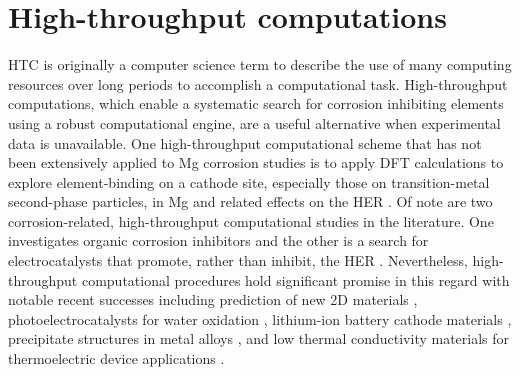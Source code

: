 \section{High-throughput computations}
\ac{HTC} is originally a computer science term to describe the use of many computing resources over long periods to accomplish a computational task.
High-throughput computations, which enable a systematic search for corrosion inhibiting elements using a robust computational engine, are a useful alternative when experimental data is unavailable. One high-throughput computational scheme that has not been extensively applied to Mg corrosion studies is to apply \ac{DFT} calculations to explore element-binding on a cathode site, especially those on transition-metal second-phase particles, in Mg and related effects on the \ac{HER} \cite{zhang2019first}. Of note are two corrosion-related, high-throughput computational studies in the literature. One investigates organic corrosion inhibitors \cite{winkler2017predicting} and the other is a search for electrocatalysts that promote, rather than inhibit, the \ac{HER} \cite{greeley2006computational}. Nevertheless, high-throughput computational procedures hold significant promise in this regard with notable recent successes including prediction of new 2D materials \cite{choudhary2017high}, photoelectrocatalysts for water oxidation \cite{yan2017solar}, lithium-ion battery cathode materials \cite{tanaka2016toward,lu2017data}, precipitate structures in metal alloys \cite{saal2013materials}, and low thermal conductivity materials for thermoelectric device applications \cite{tanaka2016toward,seko2015prediction}.